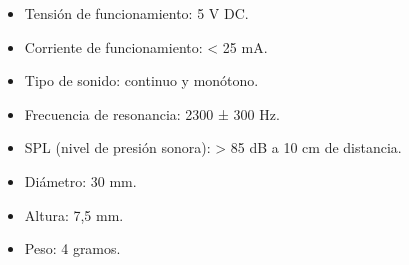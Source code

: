 \begin{itemize}
\item Tensión de funcionamiento: 5 V DC.
\item Corriente de funcionamiento: < 25 mA.
\item Tipo de sonido: continuo y monótono.
\item Frecuencia de resonancia: 2300 ± 300 Hz.
\item SPL (nivel de presión sonora): > 85 dB a 10 cm de distancia.
\item Diámetro: 30 mm.
\item Altura: 7,5 mm.
\item Peso: 4 gramos.
\end{itemize}


%
%
%
%
%
%
